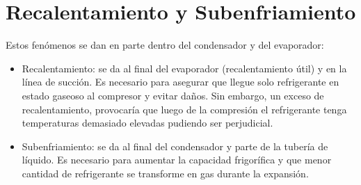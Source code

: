 \section{Recalentamiento y Subenfriamiento}

Estos fenómenos se dan en parte dentro del condensador y del evaporador:
\begin{itemize}
\item Recalentamiento: se da al final del evaporador (recalentamiento útil) y en la línea de succión. Es necesario para asegurar que llegue solo refrigerante en estado gaseoso al compresor y evitar daños. Sin embargo, un exceso de recalentamiento, provocaría que luego de la compresión el refrigerante tenga temperaturas demasiado elevadas pudiendo ser perjudicial.
\item Subenfriamiento: se da al final del condensador y parte de la tubería de líquido. Es necesario para aumentar la capacidad frigorífica y que menor cantidad de refrigerante se transforme en gas durante la expansión.
\end{itemize}
